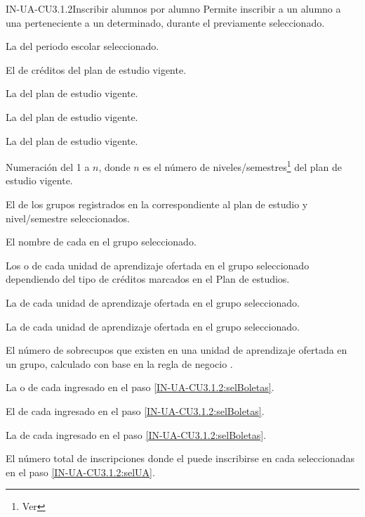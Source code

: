 \begin{UseCase}{IN-UA-CU3.1.2}{Inscribir alumnos por alumno}{
	Permite inscribir a un alumno a una  perteneciente a un  determinado, durante el  previamente seleccionado.
}
{\begin{Titemize}
    		\Titem La  del periodo escolar seleccionado.
    		
    		\Titem El  de créditos del plan de estudio vigente.
    		
    		\Titem La  del plan de estudio vigente.
    		
    		\Titem La  del plan de estudio vigente.
    		
    		\Titem La  del plan de estudio vigente.
    		
    		\Titem Numeración del 1 a ${n}$, donde ${n}$ es el número de niveles/semestres\footnote{Ver } del plan de estudio vigente.
    		
    		\Titem El  de los grupos registrados en la  correspondiente al plan de estudio y nivel/semestre seleccionados.
    		
    		\Titem El nombre de cada  en el grupo seleccionado.
    		
    		\Titem Los  o  de cada unidad de aprendizaje ofertada en el grupo seleccionado dependiendo del tipo de créditos marcados en el Plan de estudios.
    		
    		\Titem La  de cada unidad de aprendizaje ofertada en el grupo seleccionado.
    		
    		\Titem La  de cada unidad de aprendizaje ofertada en el grupo seleccionado.
    		
    		\Titem El número de sobrecupos que existen en una unidad de aprendizaje ofertada en un grupo, calculado con base en la regla de negocio .
    		
    		\Titem La  o  de cada  ingresado en el paso \ref{IN-UA-CU3.1.2:selBoletas}.
    		
    		\Titem El  de cada  ingresado en el paso \ref{IN-UA-CU3.1.2:selBoletas}.
    		
    		\Titem La  de cada  ingresado en el paso \ref{IN-UA-CU3.1.2:selBoletas}.
    		
    		\Titem El número total de inscripciones donde el  puede inscribirse en cada  seleccionadas en el paso \ref{IN-UA-CU3.1.2:selUA}.
    		

\end{Titemize}}
\end{UseCase}
